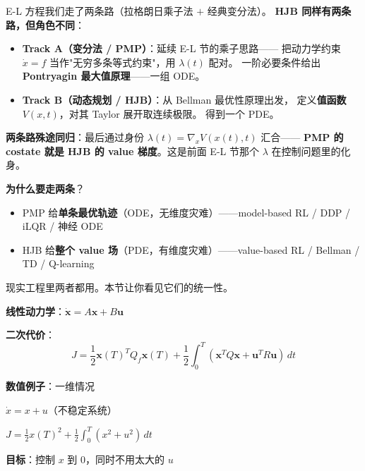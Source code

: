 \documentclass[12pt, a4paper]{ctexart}
\begin{document}
\begin{blackboard}[两条独立推导路线]

E-L 方程我们走了两条路（拉格朗日乘子法 $+$ 经典变分法）。
\textbf{HJB 同样有两条路，但角色不同}：

\begin{itemize}
    \item \textbf{Track A（变分法 / PMP）}：延续 E-L 节的乘子思路——
    把动力学约束 $\dot x = f$ 当作"无穷多条等式约束"，用 $\lambda(t)$ 配对。
    一阶必要条件给出 \textbf{Pontryagin 最大值原理}——一组 ODE。
    \item \textbf{Track B（动态规划 / HJB）}：从 Bellman 最优性原理出发，
    定义\textbf{值函数} $V(x, t)$，对其 Taylor 展开取连续极限。
    得到一个 PDE。
\end{itemize}

\textbf{两条路殊途同归}：最后通过身份 $\lambda(t) = \nabla_x V(x(t), t)$ 汇合——
\textbf{PMP 的 costate 就是 HJB 的 value 梯度}。这是前面 E-L 节那个 $\lambda$ 在控制问题里的化身。

\textbf{为什么要走两条}？
\begin{itemize}
    \item PMP 给\textbf{单条最优轨迹}（ODE，无维度灾难）——model-based RL / DDP / iLQR / 神经 ODE
    \item HJB 给\textbf{整个 value 场}（PDE，有维度灾难）——value-based RL / Bellman / TD / Q-learning
\end{itemize}
现实工程里两者都用。本节让你看见它们的统一性。

\end{blackboard}

\begin{blackboard}

\textbf{线性动力学}：$\dot{\mathbf{x}} = A\mathbf{x} + B\mathbf{u}$

\textbf{二次代价}：
\[
J = \frac{1}{2}\mathbf{x}(T)^T Q_f \mathbf{x}(T) + \frac{1}{2}\int_0^T (\mathbf{x}^T Q \mathbf{x} + \mathbf{u}^T R \mathbf{u}) \, dt
\]

\textbf{数值例子}：一维情况

$\dot{x} = x + u$（不稳定系统）

$J = \frac{1}{2}x(T)^2 + \frac{1}{2}\int_0^T (x^2 + u^2) \, dt$

\textbf{目标}：控制 $x$ 到 0，同时不用太大的 $u$

\end{blackboard}
\end{document}
